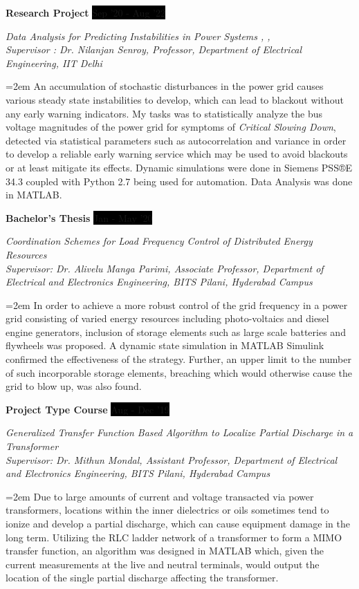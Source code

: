 \documentclass[paper=a4,fontsize=11pt]{scrartcl} %
\newcommand{\sepspace}{\vspace*{1em}}		%
\newcommand{\EducationEntry}[4]{
		\noindent \textbf{#1} \hfill      %
		\colorbox{Black}{%
			\parbox{10em}{%
			\hfill\color{White}#2}} \par  %
		\noindent \textit{#3} \par        %
		\noindent\hangindent=2em\hangafter=0 \small #4 %
		\normalsize \par}
\newcommand{\WorkEntry}[4]{				  %
		\noindent \textbf{#1} \hfill      %
		\colorbox{Black}{\color{White}#2} \par  %
		\noindent \textit{#3} \par              %
		\noindent\hangindent=2em\hangafter=0 \small #4 %
		\normalsize \par}
\begin{document}
\sepspace

\WorkEntry{Research Project}{Sep '20 - Aug '22}{Data Analysis for Predicting Instabilities in Power Systems \href{https://github.com/Realife-Brahmin/eld895_simulation_psse}{\textcolor{pythonblue}{\faGithub}}, \href{https://github.com/Realife-Brahmin/eld895_analysis_simulated_grids}{\textcolor{matlaborange}{\faGithub}}, \href{https://github.com/Realife-Brahmin/eld895_analysis_real_grids}{\textcolor{matlaborange}{\faGithub}}\\ Supervisor : Dr. Nilanjan Senroy, Professor, Department of Electrical Engineering, IIT Delhi}{An accumulation of stochastic disturbances in the power grid causes various steady state instabilities to develop, which can lead to blackout without any early warning indicators. My tasks was to statistically analyze the bus voltage magnitudes of the power grid for symptoms of \textit{Critical Slowing Down}, detected via statistical parameters such as autocorrelation and variance in order to develop a reliable early warning service which may be used to avoid blackouts or at least mitigate its effects. Dynamic simulations were done in Siemens PSS®E 34.3 coupled with Python 2.7 being used for automation. Data Analysis was done in MATLAB.}

\clearpage

\WorkEntry{Bachelor's Thesis}{Jan - May '20}{Coordination Schemes for Load Frequency Control of Distributed Energy Resources\\ Supervisor: Dr. Alivelu Manga Parimi, Associate Professor, Department of Electrical and Electronics Engineering, BITS Pilani, Hyderabad Campus}{In order to achieve a more robust control of the grid frequency in a power grid consisting of varied energy resources including photo-voltaics and diesel engine generators, inclusion of storage elements such as large scale batteries and flywheels was proposed. A dynamic state simulation in MATLAB Simulink confirmed the effectiveness of the strategy. Further, an upper limit to the number of such incorporable storage elements, breaching which would otherwise cause the grid to blow up, was also found.}
\sepspace

\WorkEntry{Project Type Course}{Aug - Dec '19}{Generalized Transfer Function Based Algorithm to Localize Partial Discharge in a Transformer \\ Supervisor: Dr. Mithun Mondal, Assistant Professor, Department of Electrical and Electronics Engineering, BITS Pilani, Hyderabad Campus}{Due to large amounts of current and voltage transacted via power transformers, locations within the inner dielectrics or oils sometimes tend to ionize and develop a partial discharge, which can cause equipment damage in the long term. Utilizing the RLC ladder network of a transformer to form a MIMO transfer function, an algorithm was designed in MATLAB which, given the current measurements at the live and neutral terminals, would output the location of the single partial discharge affecting the transformer.}
\end{document}
